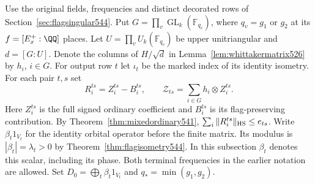 \documentclass[a4paper,11pt]{article}
\theoremstyle{definition}
\theoremstyle{remark}
\numberwithin{equation}{section}
\begin{document}
Use the original fields, frequencies and distinct decorated rows
of Section~\ref{sec:flagsingular544}. Put
\(G=\prod_v\operatorname{GL}_k(\mathbb F_{q_v})\), where \(q_v=g_1\)
or \(g_2\) at its \(f=[E_x^+:\QQ]\) places. Let
\(U=\prod_v U_k(\mathbb F_{q_v})\) be upper unitriangular and
\(d=[G:U]\). Denote the columns of \(H/\sqrt d\) in
Lemma~\ref{lem:whittakermatrix526} by \(h_i\), \(i\in G\).
For output row \(t\) let \(\iota_t\) be the marked index of its
identity isometry. For each pair \(t,s\) set
\[
 R_i^{ts}=Z_i^{ts}-B_i^{ts},\qquad
 \mathcal Z_{ts}=\sum_{i\in G}h_i\otimes Z_i^{ts}.
\]
Here \(Z_i^{ts}\) is the full signed ordinary coefficient and
\(B_i^{ts}\) is its flag-preserving contribution. By
Theorem~\ref{thm:mixedordinary541},
\(\sum_i\|R_i^{ts}\|_{\rm HS}\le e_{ts}\). Write \(\beta_t 1_{V_t}\)
for the identity orbital operator before the finite matrix. Its
modulus is \(|\beta_t|=\lambda_t>0\) by
Theorem~\ref{thm:flagisometry544}. In this subsection \(\beta_t\)
denotes this scalar, including its phase. Both terminal frequencies
in the earlier notation are allowed. Set \(D_0=\bigoplus_t
\beta_t1_{V_t}\) and \(q_*=\min(g_1,g_2)\).
\end{document}
